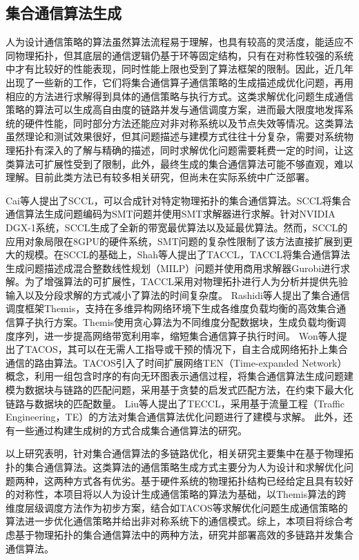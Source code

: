 \subsection{集合通信算法生成}

人为设计通信策略的算法虽然算法流程易于理解，也具有较高的灵活度，能适应不同物理拓扑，但其底层的通信逻辑仍基于环等固定结构，只有在对称性较强的系统中才有比较好的性能表现，同时性能上限也受到了算法框架的限制。因此，近几年出现了一些新的工作，它们将集合通信算子通信策略的生成描述成优化问题，再用相应的方法进行求解得到具体的通信策略与执行方式。这类求解优化问题生成通信策略的算法可以生成高自由度的链路并发与通信调度方案，进而最大限度地发挥系统的硬件性能，同时部分方法还能应对非对称系统以及节点失效等情况。这类算法虽然理论和测试效果很好，但其问题描述与建模方式往往十分复杂，需要对系统物理拓扑有深入的了解与精确的描述，同时求解优化问题需要耗费一定的时间，让这类算法可扩展性受到了限制，此外，最终生成的集合通信算法可能不够直观，难以理解。目前此类方法已有较多相关研究，但尚未在实际系统中广泛部署。

Cai等人\cite{cai2021synthesizing}提出了SCCL，可以合成针对特定物理拓扑的集合通信算法。SCCL将集合通信算法生成问题编码为SMT问题并使用SMT求解器进行求解。针对NVIDIA DGX-1系统，SCCL生成了全新的带宽最优算法以及延最优算法。然而，SCCL的应用对象局限在8GPU的硬件系统，SMT问题的复杂性限制了该方法直接扩展到更大的规模。在SCCL的基础上，Shah等人\cite{shah2023taccl}提出了TACCL，TACCL将集合通信算法生成问题描述成混合整数线性规划（MILP）问题并使用商用求解器Gurobi进行求解。为了增强算法的可扩展性，TACCL采用对物理拓扑进行人为分析并提供先验输入以及分段求解的方式减小了算法的时间复杂度。
Rashidi等人\cite{rashidi2022themis}提出了集合通信调度框架Themis，支持在多维异构网络环境下生成各维度负载均衡的高效集合通信算子执行方案。Themis使用贪心算法为不同维度分配数据块，生成负载均衡调度序列，进一步提高网络带宽利用率，缩短集合通信算子执行时间。
Won等人\cite{won2024tacos}提出了TACOS，其可以在无需人工指导或干预的情况下，自主合成网络拓扑上集合通信的路由算法。TACOS引入了时间扩展网络TEN（Time-expanded Network）概念，利用一组包含时序的有向无环图表示通信过程，将集合通信算法生成问题建模为数据块与链路的匹配问题，采用基于贪婪的启发式匹配方法，在约束下最大化链路与数据块的匹配数量。
Liu等人\cite{liu2024rethinking}提出了TECCL，采用基于流量工程（Traffic Engineering，TE）的方法对集合通信算法优化问题进行了建模与求解。
此外，还有一些通过构建生成树的方式合成集合通信算法的研究\cite{wang2020blink, zhao2024forestcoll}。

以上研究表明，针对集合通信算法的多链路优化，相关研究主要集中在基于物理拓扑的集合通信算法。这类算法的通信策略生成方式主要分为人为设计和求解优化问题两种，这两种方式各有优劣。基于硬件系统的物理拓扑结构已经给定且具有较好的对称性，本项目将以人为设计生成通信策略的算法为基础，以Themis算法的跨维度层级调度方法作为初步方案，结合如TACOS等求解优化问题生成通信策略的算法进一步优化通信策略并给出非对称系统下的通信模式。综上，本项目将综合考虑基于物理拓扑的集合通信算法中的两种方法，研究并部署高效的多链路并发集合通信算法。

